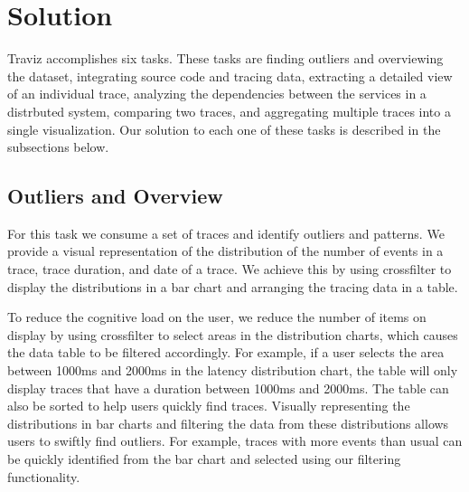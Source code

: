 \section{Solution}

Traviz accomplishes six tasks. These tasks are finding outliers and overviewing the dataset,
integrating source code and tracing data, extracting a detailed view of an individual trace, analyzing the
dependencies between the services in a distrbuted system, comparing two traces, and aggregating multiple traces
into a single visualization. Our solution to each one of these tasks is described in the subsections below.

\subsection{Outliers and Overview}

For this task we consume a set of traces and identify outliers and patterns.
We provide a visual representation of the distribution of the number of events in a trace, trace duration,
and date of a trace. We achieve this by
using crossfilter to display the distributions in a bar chart and arranging the tracing data in a table.

To reduce the cognitive load on the user, we reduce the number of items on display by using crossfilter
to select areas in the distribution charts, which causes the data table to be filtered accordingly. For example,
if a user selects the area between 1000ms and 2000ms in the latency distribution chart, the table will only display
traces that have a duration between 1000ms and 2000ms. The table can also be sorted to help users quickly find traces.
Visually representing the distributions in bar charts and filtering the data from these distributions allows users to swiftly
find outliers. For example, traces with more events than usual can be quickly identified from the bar chart and selected using our
filtering functionality.

